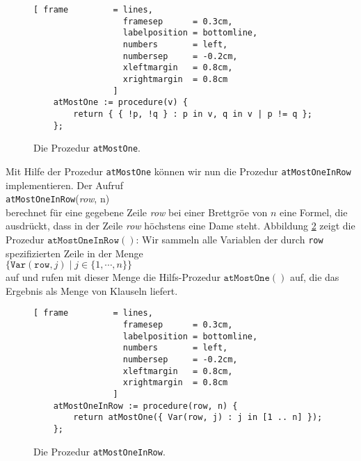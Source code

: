 \begin{figure}[!ht]
  \centering
\begin{Verbatim}[ frame         = lines, 
                  framesep      = 0.3cm, 
                  labelposition = bottomline,
                  numbers       = left,
                  numbersep     = -0.2cm,
                  xleftmargin   = 0.8cm,
                  xrightmargin  = 0.8cm
                ]
    atMostOne := procedure(v) {
        return { { !p, !q } : p in v, q in v | p != q };
    };
\end{Verbatim}
\vspace*{-0.3cm}
  \caption{Die Prozedur \texttt{atMostOne}.}
  \label{fig:atMostOne}
\end{figure}

Mit Hilfe der Prozedur \texttt{atMostOne} k\"{o}nnen wir nun die Prozedur
\texttt{atMostOneInRow} implementieren.  Der Aufruf \\[0.2cm]
\hspace*{1.3cm} \texttt{atMostOneInRow}(\textsl{row}, n) \\[0.2cm]
berechnet f\"{u}r eine gegebene Zeile \textsl{row} bei einer Brettgr\"{o}\3e von $n$ eine Formel,
die ausdr\"{u}ckt, dass in der Zeile \textsl{row} h\"{o}chstens eine Dame steht.
Abbildung \ref{fig:atMostOneInRow} zeigt die
Prozedur $\texttt{atMostOneInRow}()$: Wir sammeln alle Variablen der durch \texttt{row}
spezifizierten Zeile
in der Menge 
\\[0.2cm]
\hspace*{1.3cm}
$\bigl\{ \mathtt{Var}(\mathtt{row},j) \mid j \in \{1, \cdots, n \} \bigr\}$
\\[0.2cm]
 auf und rufen mit dieser Menge die Hilfs-Prozedur $\texttt{atMostOne}()$ auf, die das Ergebnis
als Menge von Klauseln liefert.

\begin{figure}[!ht]
  \centering
\begin{Verbatim}[ frame         = lines, 
                  framesep      = 0.3cm, 
                  labelposition = bottomline,
                  numbers       = left,
                  numbersep     = -0.2cm,
                  xleftmargin   = 0.8cm,
                  xrightmargin  = 0.8cm
                ]
    atMostOneInRow := procedure(row, n) {
        return atMostOne({ Var(row, j) : j in [1 .. n] });
    };
\end{Verbatim}
\vspace*{-0.3cm}
  \caption{Die Prozedur \texttt{atMostOneInRow}.}
  \label{fig:atMostOneInRow}
\end{figure}

